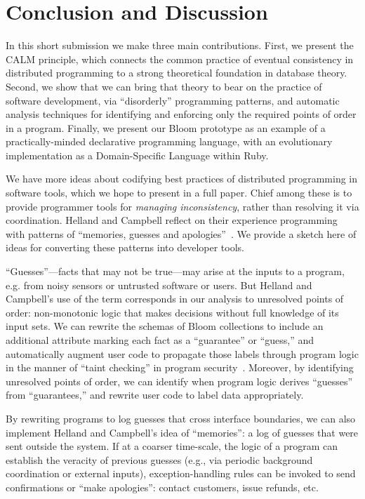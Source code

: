 \section{Conclusion and Discussion}
\label{sec:conclusion}
In this short submission we make three main contributions.  First, we present the CALM principle, which connects the common practice of eventual consistency in distributed programming to a strong theoretical foundation in database theory.  Second, we show that we can bring that theory to bear on the practice of software development, via ``disorderly'' programming patterns, and automatic analysis techniques for  identifying and enforcing only the required points of order in a program. Finally, we present our Bloom prototype as an example of a practically-minded declarative programming language, with an evolutionary implementation as a Domain-Specific Language within Ruby.

We have more ideas about codifying best practices of distributed programming in software tools, which we hope to present in a full paper.  Chief among these is to provide programmer tools for \emph{managing inconsistency}, rather than resolving it via coordination.  Helland and Campbell reflect on their experience programming with patterns of ``memories, guesses and apologies''~\cite{quicksand}.  We provide a sketch here of ideas for converting these patterns into developer tools.

``Guesses''---facts that may not be true---may arise at the inputs to a program, e.g. from noisy sensors or untrusted software or users.  But Helland and Campbell's use of the term corresponds in our analysis to unresolved points of order: non-monotonic logic that makes decisions without full knowledge of its input sets.  We can rewrite the schemas of Bloom collections to include an additional attribute marking each fact as a ``guarantee'' or ``guess,'' and automatically augment user code to propagate those labels through program logic in the manner of ``taint checking'' in program security~\cite{taint,asbestos}.  Moreover, by identifying unresolved points of order, we can identify when program logic derives ``guesses'' from ``guarantees,'' and rewrite user code to label data appropriately.

By rewriting programs to log guesses that cross interface boundaries, we can also implement Helland and Campbell's idea of ``memories'': a log of guesses that were sent outside the system.  If at a coarser time-scale, the logic of a program can establish the veracity of previous guesses (e.g., via periodic background coordination or external inputs), exception-handling rules can be invoked to send confirmations or ``make apologies'': contact customers, issue refunds, etc.

